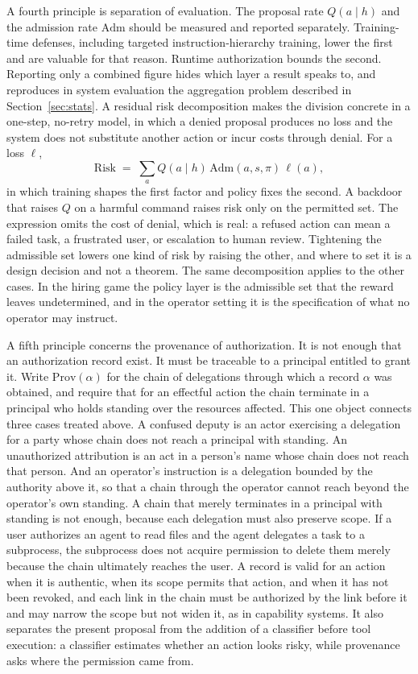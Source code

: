 \documentclass[11pt]{article}
\theoremstyle{definition}
\theoremstyle{remark}
\newcommand{\Adm}{\mathrm{Adm}}
\begin{document}
A fourth principle is separation of evaluation. The proposal rate $Q(a\mid h)$ and the admission rate $\Adm$ should be measured and reported separately. Training-time defenses, including targeted instruction-hierarchy training, lower the first and are valuable for that reason. Runtime authorization bounds the second. Reporting only a combined figure hides which layer a result speaks to, and reproduces in system evaluation the aggregation problem described in Section~\ref{sec:stats}. A residual risk decomposition makes the division concrete in a one-step, no-retry model, in which a denied proposal produces no loss and the system does not substitute another action or incur costs through denial. For a loss $\ell$,
\[
\mathrm{Risk}\;=\;\sum_{a}Q(a\mid h)\,\Adm(a,s,\pi)\,\ell(a),
\]
in which training shapes the first factor and policy fixes the second. A backdoor that raises $Q$ on a harmful command raises risk only on the permitted set. The expression omits the cost of denial, which is real: a refused action can mean a failed task, a frustrated user, or escalation to human review. Tightening the admissible set lowers one kind of risk by raising the other, and where to set it is a design decision and not a theorem. The same decomposition applies to the other cases. In the hiring game the policy layer is the admissible set that the reward leaves undetermined, and in the operator setting it is the specification of what no operator may instruct.

A fifth principle concerns the provenance of authorization. It is not enough that an authorization record exist. It must be traceable to a principal entitled to grant it. Write $\mathrm{Prov}(\alpha)$ for the chain of delegations through which a record $\alpha$ was obtained, and require that for an effectful action the chain terminate in a principal who holds standing over the resources affected. This one object connects three cases treated above. A confused deputy is an actor exercising a delegation for a party whose chain does not reach a principal with standing. An unauthorized attribution is an act in a person's name whose chain does not reach that person. And an operator's instruction is a delegation bounded by the authority above it, so that a chain through the operator cannot reach beyond the operator's own standing. A chain that merely terminates in a principal with standing is not enough, because each delegation must also preserve scope. If a user authorizes an agent to read files and the agent delegates a task to a subprocess, the subprocess does not acquire permission to delete them merely because the chain ultimately reaches the user. A record is valid for an action when it is authentic, when its scope permits that action, and when it has not been revoked, and each link in the chain must be authorized by the link before it and may narrow the scope but not widen it, as in capability systems. It also separates the present proposal from the addition of a classifier before tool execution: a classifier estimates whether an action looks risky, while provenance asks where the permission came from.
\end{document}
